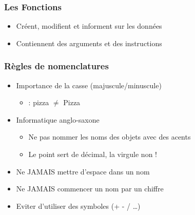 \documentclass{beamer}
\begin{document}
\begin{frame}
	\frametitle{Les Fonctions}
	\begin{center}
		\begin{itemize}
			\item Créent, modifient et informent sur les données
			\item Contiennent des arguments et des instructions
		\end{itemize}
	\end{center}
\end{frame}

\begin{frame}
	\frametitle{Règles de nomenclatures}
	\begin{itemize}
		\item Importance de la casse (majuscule/minuscule)
			\begin{itemize}
				\item : pizza  $\neq$ Pizza
			\end{itemize}
		\item Informatique anglo-saxone
			\begin{itemize}
				\item Ne pas nommer les noms des objets avec des acents
				\item Le point sert de décimal, la virgule non !
			\end{itemize}
		\item Ne JAMAIS mettre d'espace dans un nom
		\item Ne JAMAIS commencer un nom par un chiffre
		\item Eviter d'utiliser des symboles (+ - / \dots)
	\end{itemize}
\end{frame}
\end{document}

